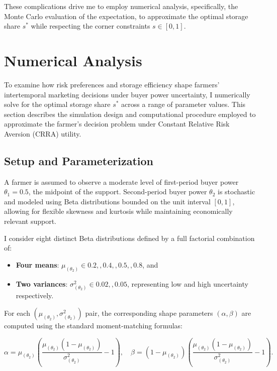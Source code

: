 These complications drive me to employ numerical analysis, specifically, the Monte Carlo evaluation of the expectation, to approximate the optimal storage share $s^{*}$ while respecting the corner constraints $s\in[0,1]$.





\section{Numerical Analysis} \label{Section: Base Model Numerical Analysis}
\noindent To examine how risk preferences and storage efficiency shape farmers’ intertemporal marketing decisions under buyer power uncertainty, I numerically solve for the optimal storage share $s^*$ across a range of parameter values. This section describes the simulation design and computational procedure employed to approximate the farmer’s decision problem under Constant Relative Risk Aversion (CRRA) utility.


\subsection{Setup and Parameterization}
\noindent A farmer is assumed to observe a moderate level of first-period buyer power $\theta_1 = 0.5$, the midpoint of the support. Second-period buyer power $\theta_2$ is stochastic and modeled using Beta distributions bounded on the unit interval $[0,1]$, allowing for flexible skewness and kurtosis while maintaining economically relevant support.

I consider eight distinct Beta distributions defined by a full factorial combination of:
\begin{itemize}
\item \textbf{Four means}: $\mu_{(\theta_2)} \in {0.2,,0.4,,0.5,,0.8}$, and
\item \textbf{Two variances}: $\sigma^2_{(\theta_2)} \in {0.02,,0.05}$, representing low and high uncertainty respectively.
\end{itemize}

For each $(\mu_{(\theta_2)}, \sigma^2_{(\theta_2)})$ pair, the corresponding shape parameters $(\alpha, \beta)$ are computed using the standard moment-matching formulas:

$$
\alpha = \mu_{(\theta_2)} \left( \frac{\mu_{(\theta_2)}(1 - \mu_{(\theta_2)})}{\sigma^2_{(\theta_2)}} - 1 \right), \quad
\beta = (1 - \mu_{(\theta_2)}) \left( \frac{\mu_{(\theta_2)}(1 - \mu_{(\theta_2)})}{\sigma^2_{(\theta_2)}} - 1 \right).
$$

